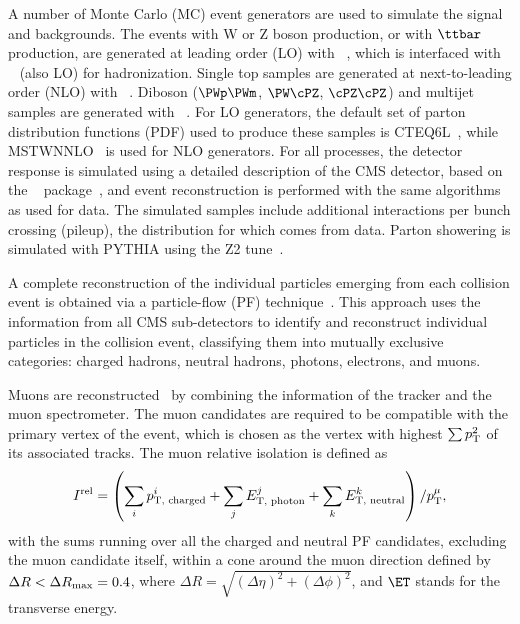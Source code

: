 A number of Monte Carlo (MC) event generators are used to simulate the signal and
backgrounds. 
The  events with W or Z boson production, or with $\ttbar$ production, are generated at leading order (LO) 
with ~\cite{Madgraph5}, which is interfaced with ~\cite{Sjostrand:2006za} (also LO)
for hadronization.
Single top samples are generated at next-to-leading order (NLO) with 
~\cite{Alioli:2008gx,Nason:2004rx,Frixione:2007vw}.
Diboson ($\WW$, $\WZ$, $\ZZ$) and multijet samples are
generated with 
~\cite{Sjostrand:2006za}. 
For LO generators, the default set of parton distribution functions
(PDF) used to produce these samples is CTEQ6L~\cite{CTEQ66}, while
MSTWNNLO~\cite{Martin:2009iq} is used for NLO generators.
For all processes, the detector response is simulated using a detailed
description of the CMS detector, based on the \GEANTfour~
package~\cite{GEANT}, and event reconstruction is performed with
the same algorithms as used for data.
The simulated samples include additional interactions per bunch crossing (pileup),
the distribution for which comes from data.
Parton showering is simulated with PYTHIA using the Z2 tune~\cite{Field:2010bc}.

A complete reconstruction of the individual particles emerging from each collision event is obtained 
via a particle-flow (PF) technique~\cite{CMS-PAS-PFT-09-001, CMS-PAS-PFT-10-002}. This 
approach uses the information from all CMS sub-detectors to identify and 
reconstruct individual particles in the collision event, classifying 
them into mutually exclusive categories: charged hadrons, neutral hadrons, photons, electrons, and muons.

Muons are reconstructed~\cite{CMS-PAS-MUO-10-002}
by combining the information of the tracker and the muon spectrometer.
The muon candidates are required to be compatible with the primary vertex of the
event, which is chosen as the vertex with highest $\sum p_\mathrm{T}^2$ of its associated tracks.
The muon relative isolation is defined as
\begin{equation*}
I^{\rm{rel}} = \left( \sum_{i}
p_{\text{T, charged}}^i+ \sum_{j}  E_{\text{T, photon}}^j  +\sum_{k}  E_{\text{T, neutral}}^k \right) /p_\mathrm{T}^{\mu},
\end{equation*}
with the sums running over all the charged and neutral PF candidates,
excluding the muon candidate itself, 
within a cone around the muon direction
defined by  $\Delta R  < \Delta R_{\rm max} = 0.4$,
where
$\Delta R = \sqrt { (\Delta \eta)^2 + (\Delta \phi)^2 }$, and
$\ET$ stands for the
transverse energy.

